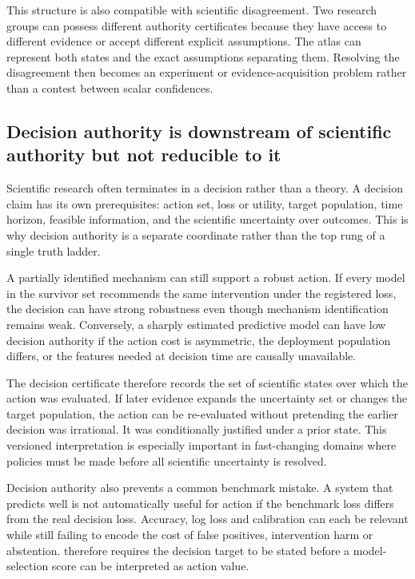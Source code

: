 This structure is also compatible with scientific disagreement. Two research groups can possess different authority certificates because they have access to different evidence or accept different explicit assumptions. The atlas can represent both states and the exact assumptions separating them. Resolving the disagreement then becomes an experiment or evidence-acquisition problem rather than a contest between scalar confidences.

\subsection{Decision authority is downstream of scientific authority but not reducible to it}

Scientific research often terminates in a decision rather than a theory. A decision claim has its own prerequisites: action set, loss or utility, target population, time horizon, feasible information, and the scientific uncertainty over outcomes. This is why decision authority is a separate coordinate rather than the top rung of a single truth ladder.

A partially identified mechanism can still support a robust action. If every model in the survivor set recommends the same intervention under the registered loss, the decision can have strong robustness even though mechanism identification remains weak. Conversely, a sharply estimated predictive model can have low decision authority if the action cost is asymmetric, the deployment population differs, or the features needed at decision time are causally unavailable.

The decision certificate therefore records the set of scientific states over which the action was evaluated. If later evidence expands the uncertainty set or changes the target population, the action can be re-evaluated without pretending the earlier decision was irrational. It was conditionally justified under a prior state. This versioned interpretation is especially important in fast-changing domains where policies must be made before all scientific uncertainty is resolved.

Decision authority also prevents a common benchmark mistake. A system that predicts well is not automatically useful for action if the benchmark loss differs from the real decision loss. Accuracy, log loss and calibration can each be relevant while still failing to encode the cost of false positives, intervention harm or abstention. \RAKL{} therefore requires the decision target to be stated before a model-selection score can be interpreted as action value.

